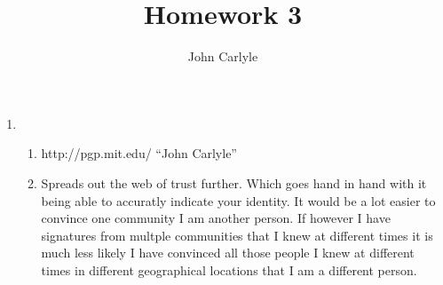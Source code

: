 \documentclass{article}
\title{Homework 3}
\author{John Carlyle}
\begin{document}
\maketitle

\begin{enumerate}
  \item
    \begin{enumerate}
      \item http://pgp.mit.edu/ ``John Carlyle''
      \item Spreads out the web of trust further. Which goes hand in hand with it being able to accuratly indicate your identity. It would be a lot easier to convince one community I am another person. If however I have signatures from multple communities that I knew at different times it is much less likely I have convinced all those people I knew at different times in different geographical locations that I am a different person.
    \end{enumerate}


\end{enumerate}
\end{document}
